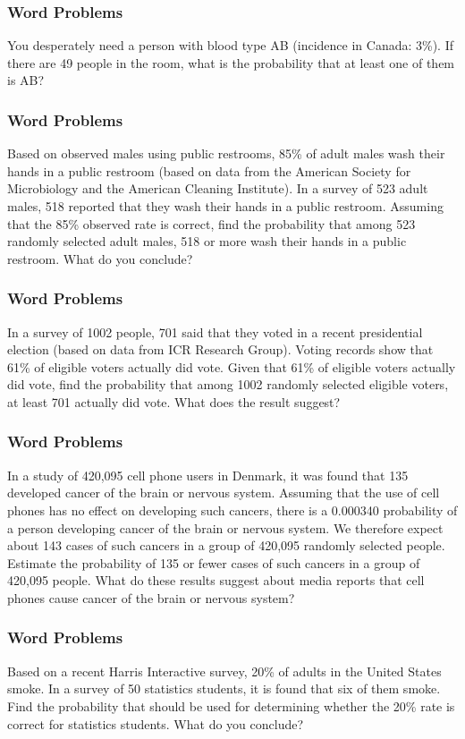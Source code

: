 \documentclass[xcolor=dvipsnames]{beamer}
\begin{document}
\begin{frame}
  \frametitle{Word Problems}
  {\ubung} You desperately need a person with blood type AB (incidence
  in Canada: 3\%). If there are 49 people in the room, what is the
  probability that at least one of them is AB?
\end{frame}

\begin{frame}
  \frametitle{Word Problems}
  {\ubung} Based on observed males using public restrooms, 85\% of
  adult males wash their hands in a public restroom (based on data
  from the American Society for Microbiology and the American Cleaning
  Institute). In a survey of 523 adult males, 518 reported that they
  wash their hands in a public restroom. Assuming that the 85\%
  observed rate is correct, find the probability that among 523
  randomly selected adult males, 518 or more wash their hands in a
  public restroom. What do you conclude?
\end{frame}

\begin{frame}
  \frametitle{Word Problems}
  {\ubung} In a survey of 1002 people, 701 said that they voted in a
  recent presidential election (based on data from ICR Research
  Group). Voting records show that 61\% of eligible voters actually
  did vote. Given that 61\% of eligible voters actually did vote, find
  the probability that among 1002 randomly selected eligible voters,
  at least 701 actually did vote. What does the result suggest?
\end{frame}

\begin{frame}
  \frametitle{Word Problems}
  {\ubung} In a study of 420,095 cell phone users in Denmark, it was
  found that 135 developed cancer of the brain or nervous system.
  Assuming that the use of cell phones has no effect on developing
  such cancers, there is a 0.000340 probability of a person developing
  cancer of the brain or nervous system. We therefore expect about 143
  cases of such cancers in a group of 420,095 randomly selected
  people. Estimate the probability of 135 or fewer cases of such
  cancers in a group of 420,095 people. What do these results suggest
  about media reports that cell phones cause cancer of the brain or
  nervous system?
\end{frame}

\begin{frame}
  \frametitle{Word Problems}
  {\ubung} Based on a recent Harris Interactive survey, 20\% of adults
  in the United States smoke. In a survey of 50 statistics students,
  it is found that six of them smoke. Find the probability that should
  be used for determining whether the 20\% rate is correct for
  statistics students. What do you conclude?
\end{frame}
\end{document}
